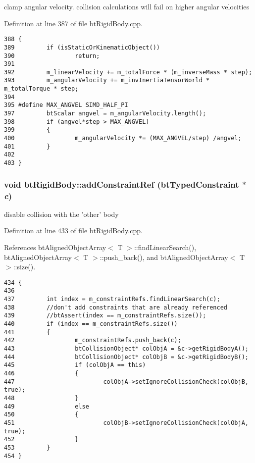 clamp angular velocity. collision calculations will fail on higher angular velocities 

Definition at line 387 of file btRigidBody.cpp.

\begin{Code}\begin{verbatim}388 {
389         if (isStaticOrKinematicObject())
390                 return;
391 
392         m_linearVelocity += m_totalForce * (m_inverseMass * step);
393         m_angularVelocity += m_invInertiaTensorWorld * m_totalTorque * step;
394 
395 #define MAX_ANGVEL SIMD_HALF_PI
397         btScalar angvel = m_angularVelocity.length();
398         if (angvel*step > MAX_ANGVEL)
399         {
400                 m_angularVelocity *= (MAX_ANGVEL/step) /angvel;
401         }
402 
403 }
\end{verbatim}
\end{Code}


\hypertarget{classbt_rigid_body_1c89df31d2a10f06cc81da0e4b573297}{
\subsubsection[addConstraintRef]{\setlength{\rightskip}{0pt plus 5cm}void btRigidBody::addConstraintRef (btTypedConstraint $\ast$ {\em c})}}
\label{classbt_rigid_body_1c89df31d2a10f06cc81da0e4b573297}




disable collision with the 'other' body 

Definition at line 433 of file btRigidBody.cpp.

References btAlignedObjectArray$<$ T $>$::findLinearSearch(), btAlignedObjectArray$<$ T $>$::push\_\-back(), and btAlignedObjectArray$<$ T $>$::size().

\begin{Code}\begin{verbatim}434 {
436 
437         int index = m_constraintRefs.findLinearSearch(c);
438         //don't add constraints that are already referenced
439         //btAssert(index == m_constraintRefs.size());
440         if (index == m_constraintRefs.size())
441         {
442                 m_constraintRefs.push_back(c);
443                 btCollisionObject* colObjA = &c->getRigidBodyA();
444                 btCollisionObject* colObjB = &c->getRigidBodyB();
445                 if (colObjA == this)
446                 {
447                         colObjA->setIgnoreCollisionCheck(colObjB, true);
448                 }
449                 else
450                 {
451                         colObjB->setIgnoreCollisionCheck(colObjA, true);
452                 }
453         } 
454 }
\end{verbatim}
\end{Code}




